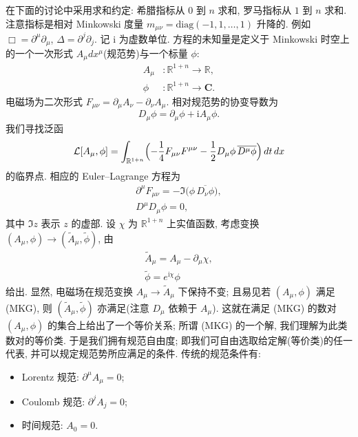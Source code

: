 在下面的讨论中采用求和约定: 希腊指标从 $0$ 到 $n$ 求和, 罗马指标从 $1$ 到 $n$ 求和. 注意指标是相对 Minkowski 度量 $m_{\mu\nu}=\mathrm{diag}(-1,1,\ldots,1)$ 升降的. 例如 $\Box=\partial^\mu\partial_\mu$, $\Delta=\partial^j\partial_j$. 记 $\mathrm{i}$ 为虚数单位.
方程的未知量是定义于 Minkowski 时空上的一个一次形式 $A_\mu dx^\mu$(规范势)与一个标量 $\phi$:
\begin{equation}
\begin{aligned}
A_\mu&:\mathbb{R}^{1+n}\to\mathbb{R},\\
\phi&:\mathbb{R}^{1+n}\to\mathbf{C}.\end{aligned}
\end{equation}
电磁场为二次形式 $F_{\mu\nu}=\partial_\mu A_\nu-\partial_\nu A_\mu$. 相对规范势的协变导数为
\begin{equation}
D_\mu\phi=\partial_\mu\phi+\mathrm{i}A_\mu\phi.\end{equation}
我们寻找泛函
\begin{equation}
\mathcal{L}[A_\mu,\phi]=\int_{\mathbb{R}^{1+n}}\Bigl(-\frac14 F_{\mu\nu}F^{\mu\nu}-\frac12 D_\mu\phi\,\overline{D^\mu\phi}\Bigr)\,dt\,dx
\end{equation}
的临界点. 相应的 Euler--Lagrange 方程为
\begin{gather}
\partial^\mu F_{\mu\nu}=-\Im\bigl(\phi\,\overline{D_\nu\phi}\bigr),\\
D^\mu D_\mu\phi=0,\end{gather}
其中 $\Im z$ 表示 $z$ 的虚部.
设 $\chi$ 为 $\mathbb{R}^{1+n}$ 上实值函数, 考虑变换 $(A_\mu,\phi)\to(\widetilde A_\mu,\widetilde\phi)$, 由
\begin{gather}
\widetilde A_\mu=A_\mu-\partial_\mu\chi,\\
\widetilde\phi=e^{\mathrm{i}\chi}\phi
\end{gather}
给出. 显然, 电磁场在规范变换 $A_\mu\to\widetilde A_\mu$ 下保持不变; 且易见若 $(A_\mu,\phi)$ 满足 (MKG), 则 $(\widetilde A_\mu,\widetilde\phi)$ 亦满足(注意 $D_\mu$ 依赖于 $A_\mu$). 这就在满足 (MKG) 的数对 $(A_\mu,\phi)$ 的集合上给出了一个等价关系; 所谓 (MKG) 的一个解, 我们理解为此类数对的等价类.
于是我们拥有规范自由度; 即我们可自由选取给定解(等价类)的任一代表, 并可以规定规范势所应满足的条件. 传统的规范条件有:
\begin{itemize}
\item Lorentz 规范: $\partial^\mu A_\mu=0$;
\item Coulomb 规范: $\partial^j A_j=0$;
\item 时间规范: $A_0=0$.\end{itemize}

